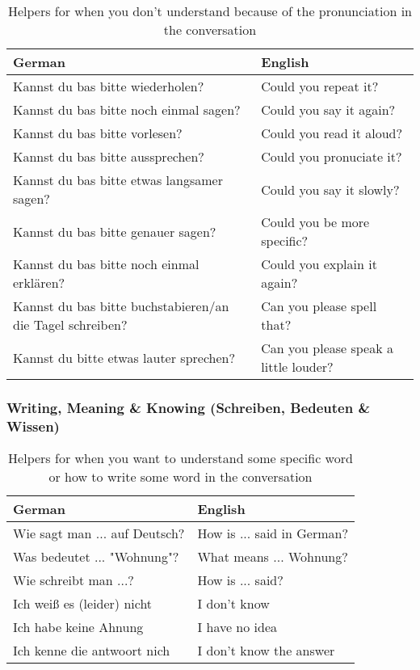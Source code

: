 \begin{table}[H]
    \centering
    \begin{tabular}{l|l}
        \textbf{German} & \textbf{English} \\
        \hline
        Kannst du bas bitte wiederholen? & Could you repeat it?\\
        Kannst du bas bitte noch einmal sagen? & Could you say it again?\\
        Kannst du bas bitte vorlesen? & Could you read it aloud?\\
        Kannst du bas bitte aussprechen? & Could you pronuciate it?\\
        Kannst du bas bitte etwas langsamer sagen? & Could you say it slowly?\\
        Kannst du bas bitte genauer sagen? & Could you be more specific?\\
        Kannst du bas bitte noch einmal erklären? & Could you explain it again?\\
        Kannst du bas bitte buchstabieren/an die Tagel schreiben? & Can you please spell that?\\
        Kannst du bitte etwas lauter sprechen? & Can you please speak a little louder?\\
    \end{tabular}
    \caption{Helpers for when you don't understand because of the pronunciation in the conversation}
    \label{tab:helperpronouncing}
\end{table}

\subsubsection{Writing, Meaning \& Knowing (Schreiben, Bedeuten \& Wissen)}

\begin{table}[H]
    \centering
    \begin{tabular}{l|l}
        \textbf{German} & \textbf{English} \\
        \hline
        Wie sagt man ... auf Deutsch? & How is ... said in German?\\
        Was bedeutet ... "Wohnung"? & What means ... Wohnung?\\
        Wie schreibt man ...? & How is ... said?\\
        Ich wei\ss{} es (leider) nicht & I don't know\\
        Ich habe keine Ahnung & I have no idea\\
        Ich kenne die antwoort nich & I don't know the answer\\
    \end{tabular}
    \caption{Helpers for when you want to understand some specific word or how to write some word in the conversation}
    \label{tab:helpersmeaning}
\end{table}